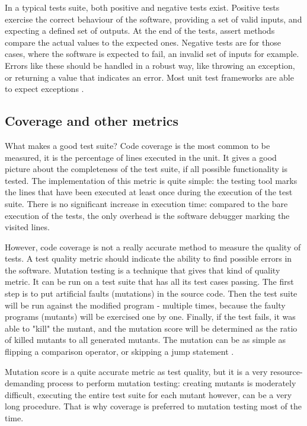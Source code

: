 In a typical tests suite, both positive and negative tests exist. Positive tests exercise the correct behaviour of the software, providing a set of valid inputs, and expecting a defined set of outputs. At the end of the tests, assert methods compare the actual values to the expected ones. Negative tests are for those cases, where the software is expected to fail, an invalid set of inputs for example. Errors like these should be handled in a robust way, like throwing an exception, or returning a value that indicates an error. Most unit test frameworks are able to expect exceptions \cite{Olan:2003:UTT:948785.948830}.

\subsection{Coverage and other metrics}
What makes a good test suite? Code coverage is the most common to be measured, it is the percentage of lines executed in the unit. It gives a good picture about the completeness of the test suite, if all possible functionality is tested. The implementation of this metric is quite simple: the testing tool marks the lines that have been executed at least once during the execution of the test suite. There is no significant increase in execution time: compared to the bare execution of the tests, the only overhead is the software debugger marking the visited lines.

However, code coverage is not a really accurate method to measure the quality of tests. A test quality metric should indicate the ability to find possible errors in the software. Mutation testing is a technique that gives that kind of quality metric. It can be run on a test suite that has all its test cases passing. The first step is to put artificial faults (mutations) in the source code. Then the test suite will be run against the modified program - multiple times, because the faulty programs (mutants) will be exercised one by one. Finally, if the test fails, it was able to "kill" the mutant, and the mutation score will be determined as the ratio of killed mutants to all generated mutants. The mutation can be as simple as flipping a comparison operator, or skipping a jump statement \cite{5487526, aron_mut}. 

Mutation score is a quite accurate metric as test quality, but it is a very resource-demanding process to perform mutation testing: creating mutants is moderately difficult, executing the entire test suite for each mutant however, can be a very long procedure. That is why coverage is preferred to mutation testing most of the time.

